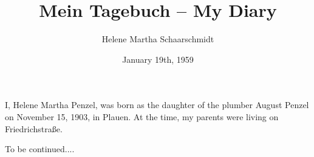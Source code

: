 \documentclass[a5paper]{book}
\title{Mein Tagebuch -- My Diary}
\author{Helene Martha Schaarschmidt}
\date{January 19th, 1959}
\begin{document}
\maketitle

\newpage
\setcounter{page}{1}
I, Helene Martha Penzel, was born as the daughter of the plumber August Penzel on November 15, 1903, in Plauen. At the time, my parents were living on Friedrichstraße.

\newpage
To be continued....

\newpage
\end{document}
